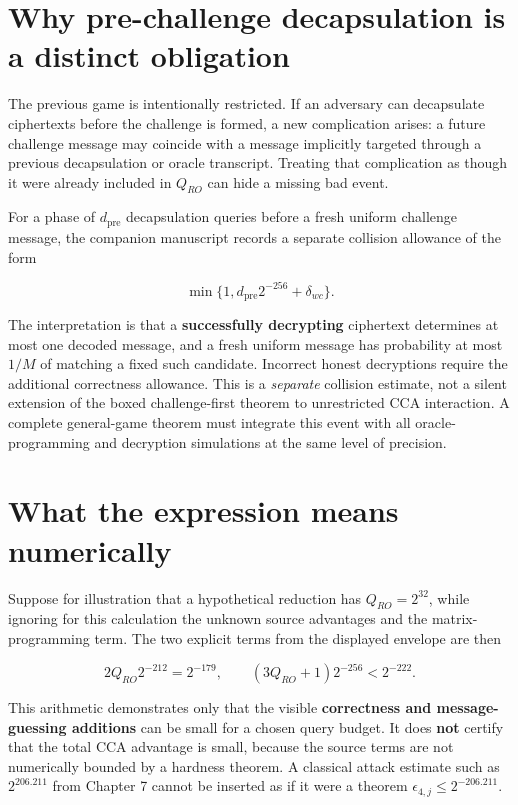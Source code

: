 \documentclass[
  11pt,
  a4paper,
  oneside]{report}
\begin{document}
\section{Why pre-challenge decapsulation is a distinct
obligation}\label{why-pre-challenge-decapsulation-is-a-distinct-obligation}

The previous game is intentionally restricted. If an adversary can
decapsulate ciphertexts before the challenge is formed, a new
complication arises: a future challenge message may coincide with a
message implicitly targeted through a previous decapsulation or oracle
transcript. Treating that complication as though it were already
included in \(Q_{RO}\) can hide a missing bad event.

For a phase of \(d_{\mathrm{pre}}\) decapsulation queries before a fresh
uniform challenge message, the companion manuscript records a separate
collision allowance of the form

\[
\min\{1,d_{\mathrm{pre}}2^{-256}+\delta_{wc}\}.
\]

The interpretation is that a \textbf{successfully decrypting} ciphertext
determines at most one decoded message, and a fresh uniform message has
probability at most \(1/M\) of matching a fixed such candidate.
Incorrect honest decryptions require the additional correctness
allowance. This is a \emph{separate} collision estimate, not a silent
extension of the boxed challenge-first theorem to unrestricted CCA
interaction. A complete general-game theorem must integrate this event
with all oracle-programming and decryption simulations at the same level
of precision.

\section{What the expression means
numerically}\label{what-the-expression-means-numerically}

Suppose for illustration that a hypothetical reduction has
\(Q_{RO}=2^{32}\), while ignoring for this calculation the unknown
source advantages and the matrix-programming term. The two explicit
terms from the displayed envelope are then

\[
2Q_{RO}2^{-212}=2^{-179},
\qquad
(3Q_{RO}+1)2^{-256}<2^{-222}.
\]

This arithmetic demonstrates only that the visible \textbf{correctness
and message-guessing additions} can be small for a chosen query budget.
It does \textbf{not} certify that the total CCA advantage is small,
because the source terms are not numerically bounded by a hardness
theorem. A classical attack estimate such as \(2^{206.211}\) from
Chapter 7 cannot be inserted as if it were a theorem
\(\epsilon_{4,j}\le2^{-206.211}\).
\end{document}
